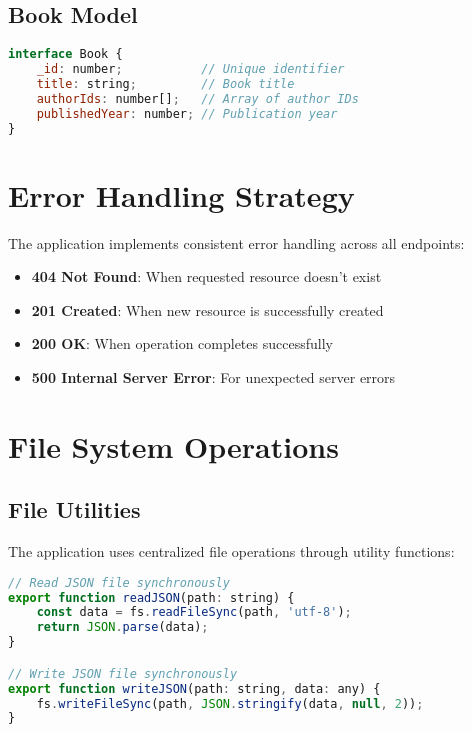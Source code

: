 \documentclass[11pt,a4paper]{article}
\begin{document}
\subsection{Book Model}
\begin{lstlisting}[language=JavaScript, caption=Book Interface]
interface Book {
    _id: number;           // Unique identifier
    title: string;         // Book title
    authorIds: number[];   // Array of author IDs
    publishedYear: number; // Publication year
}
\end{lstlisting}

\section{Error Handling Strategy}

The application implements consistent error handling across all endpoints:

\begin{itemize}
    \item \textbf{404 Not Found}: When requested resource doesn't exist
    \item \textbf{201 Created}: When new resource is successfully created
    \item \textbf{200 OK}: When operation completes successfully
    \item \textbf{500 Internal Server Error}: For unexpected server errors
\end{itemize}

\section{File System Operations}

\subsection{File Utilities}
The application uses centralized file operations through utility functions:

\begin{lstlisting}[language=JavaScript, caption=File Utilities]
// Read JSON file synchronously
export function readJSON(path: string) {
    const data = fs.readFileSync(path, 'utf-8');
    return JSON.parse(data);
}

// Write JSON file synchronously
export function writeJSON(path: string, data: any) {
    fs.writeFileSync(path, JSON.stringify(data, null, 2));
}
\end{lstlisting}
\end{document}
